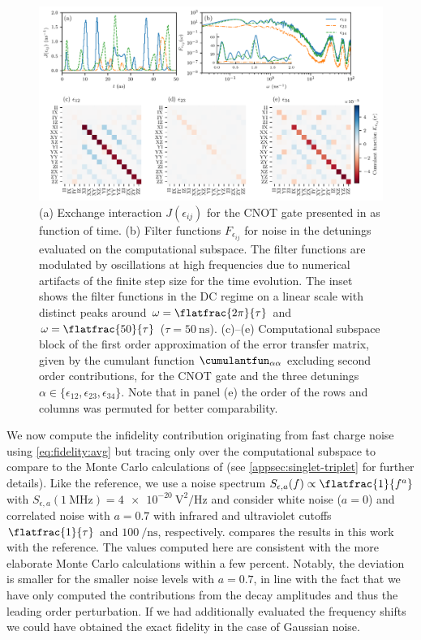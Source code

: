 \begin{figure}[tbp]
    \centering
    \includegraphics[width=\textwidth]{img/all_in_one_alpha-0-7_linear_complete_CNOT.pdf}
    \caption{(a) Exchange interaction $J(\epsilon_{ij})$ for the CNOT gate presented in  as function of time. (b) Filter functions $F_{\epsilon_{ij}}$ for noise in the detunings evaluated on the computational subspace. The filter functions are modulated by oscillations at high frequencies due to numerical artifacts of the finite step size for the time evolution. The inset shows the filter functions in the DC regime on a linear scale with distinct peaks around $\omega = \flatfrac{2\pi}{\tau}$ and $\omega = \flatfrac{50}{\tau}$ ($\tau = \SI{50}{\nano\second}$). (c)--(e) Computational subspace block of the first order approximation of the error transfer matrix, given by the cumulant function $\cumulantfun_{\alpha\alpha}$ excluding second order contributions, for the CNOT gate and the three detunings $\alpha\in\lbrace\epsilon_{12},\epsilon_{23},\epsilon_{34}\rbrace$. Note that in panel (e) the order of the rows and columns was permuted for better comparability.}
    \label{fig:CNOT}
\end{figure}

We now compute the infidelity contribution originating from fast charge noise using \cref{eq:fidelity:avg} but tracing only over the computational subspace to compare to the Monte Carlo calculations of  (see \cref{appsec:singlet-triplet} for further details). Like the reference, we use a noise spectrum $S_{\epsilon,a}(f)\propto \flatfrac{1}{f^a}$ with $S_{\epsilon,a}(\SI{1}{\MHz}) = \SI{4e-20}{\volt\squared\per\Hz}$ and consider white noise ($a = 0$) and correlated noise with $a = 0.7$ \cite{Dial2013} with infrared and ultraviolet cutoffs $\flatfrac{1}{\tau}$ and $\SI{100}{\per\nano\second}$, respectively.  compares the results in this work with the reference. The values computed here are consistent with the more elaborate Monte Carlo calculations within a few percent. Notably, the deviation is smaller for the smaller noise levels with $a = \num{0.7}$, in line with the fact that we have only computed the contributions from the decay amplitudes \decayamps and thus the leading order perturbation. If we had additionally evaluated the frequency shifts \freqshifts we could have obtained the exact fidelity in the case of Gaussian noise.

